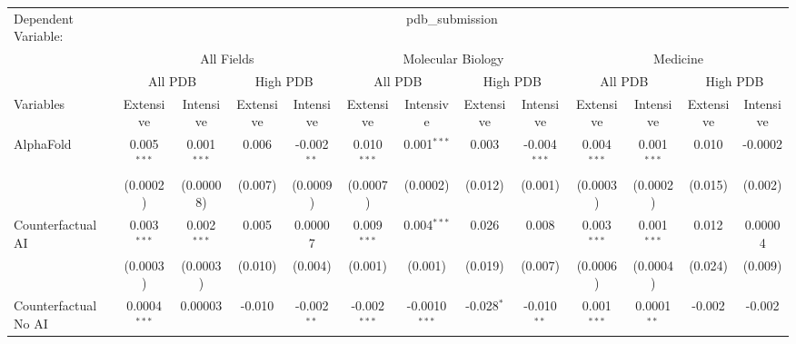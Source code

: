 \begingroup
\centering
\begin{tabular}{lcccccccccccc}
   \tabularnewline \midrule \midrule
   Dependent Variable: & \multicolumn{12}{c}{pdb\_submission}\\
 & \multicolumn{4}{c}{All Fields} & \multicolumn{4}{c}{Molecular Biology} & \multicolumn{4}{c}{Medicine} \\
\cmidrule(lr){2-5} \cmidrule(lr){6-9} \cmidrule(lr){10-13}
 & \multicolumn{2}{c}{All PDB} & \multicolumn{2}{c}{High PDB} & \multicolumn{2}{c}{All PDB} & \multicolumn{2}{c}{High PDB} & \multicolumn{2}{c}{All PDB} & \multicolumn{2}{c}{High PDB} \\
\cmidrule(lr){2-3} \cmidrule(lr){4-5} \cmidrule(lr){6-7} \cmidrule(lr){8-9} \cmidrule(lr){10-11} \cmidrule(lr){12-13}
Variables & \multicolumn{1}{c}{Extensive} & \multicolumn{1}{c}{Intensive} & \multicolumn{1}{c}{Extensive} & \multicolumn{1}{c}{Intensive} & \multicolumn{1}{c}{Extensive} & \multicolumn{1}{c}{Intensive} & \multicolumn{1}{c}{Extensive} & \multicolumn{1}{c}{Intensive} & \multicolumn{1}{c}{Extensive} & \multicolumn{1}{c}{Intensive} & \multicolumn{1}{c}{Extensive} & \multicolumn{1}{c}{Intensive} \\
\cmidrule(lr){1-1}\cmidrule(lr){2-2} \cmidrule(lr){3-3} \cmidrule(lr){4-4} \cmidrule(lr){5-5} \cmidrule(lr){6-6} \cmidrule(lr){7-7} \cmidrule(lr){8-8} \cmidrule(lr){9-9} \cmidrule(lr){10-10} \cmidrule(lr){11-11} \cmidrule(lr){12-12} \cmidrule(lr){13-13}
   AlphaFold                                & 0.005$^{***}$  & 0.001$^{***}$    & 0.006   & -0.002$^{**}$ & 0.010$^{***}$  & 0.001$^{***}$   & 0.003        & -0.004$^{***}$ & 0.004$^{***}$  & 0.001$^{***}$    & 0.010        & -0.0002\\   
                                            & (0.0002)       & (0.00008)        & (0.007) & (0.0009)      & (0.0007)       & (0.0002)        & (0.012)      & (0.001)        & (0.0003)       & (0.0002)         & (0.015)      & (0.002)\\   
   Counterfactual AI                        & 0.003$^{***}$  & 0.002$^{***}$    & 0.005   & 0.00007       & 0.009$^{***}$  & 0.004$^{***}$   & 0.026        & 0.008          & 0.003$^{***}$  & 0.001$^{***}$    & 0.012        & 0.00004\\   
                                            & (0.0003)       & (0.0003)         & (0.010) & (0.004)       & (0.001)        & (0.001)         & (0.019)      & (0.007)        & (0.0006)       & (0.0004)         & (0.024)      & (0.009)\\   
   Counterfactual No AI                     & 0.0004$^{***}$ & 0.00003          & -0.010  & -0.002$^{**}$ & -0.002$^{***}$ & -0.0010$^{***}$ & -0.028$^{*}$ & -0.010$^{**}$  & 0.001$^{***}$  & 0.0001$^{**}$    & -0.002       & -0.002\\   

\end{tabular}
